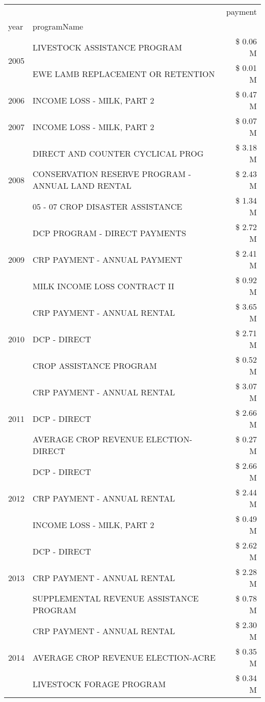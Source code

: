 \begin{tabular}{llr}
\toprule
 &  & payment \\
year & programName &  \\
\midrule
\multirow[t]{2}{*}{2005} & LIVESTOCK ASSISTANCE PROGRAM & \$ 0.06 M \\
 & EWE LAMB REPLACEMENT OR RETENTION & \$ 0.01 M \\
\cline{1-3}
2006 & INCOME LOSS - MILK, PART 2 & \$ 0.47 M \\
\cline{1-3}
2007 & INCOME LOSS - MILK, PART 2 & \$ 0.07 M \\
\cline{1-3}
\multirow[t]{3}{*}{2008} & DIRECT AND COUNTER CYCLICAL PROG & \$ 3.18 M \\
 & CONSERVATION RESERVE PROGRAM - ANNUAL LAND RENTAL & \$ 2.43 M \\
 & 05 - 07 CROP DISASTER ASSISTANCE & \$ 1.34 M \\
\cline{1-3}
\multirow[t]{3}{*}{2009} & DCP PROGRAM - DIRECT PAYMENTS & \$ 2.72 M \\
 & CRP PAYMENT - ANNUAL PAYMENT & \$ 2.41 M \\
 & MILK INCOME LOSS CONTRACT II & \$ 0.92 M \\
\cline{1-3}
\multirow[t]{3}{*}{2010} & CRP PAYMENT - ANNUAL RENTAL & \$ 3.65 M \\
 & DCP - DIRECT & \$ 2.71 M \\
 & CROP ASSISTANCE PROGRAM & \$ 0.52 M \\
\cline{1-3}
\multirow[t]{3}{*}{2011} & CRP PAYMENT - ANNUAL RENTAL & \$ 3.07 M \\
 & DCP - DIRECT & \$ 2.66 M \\
 & AVERAGE CROP REVENUE ELECTION-DIRECT & \$ 0.27 M \\
\cline{1-3}
\multirow[t]{3}{*}{2012} & DCP - DIRECT & \$ 2.66 M \\
 & CRP PAYMENT - ANNUAL RENTAL & \$ 2.44 M \\
 & INCOME LOSS - MILK, PART 2 & \$ 0.49 M \\
\cline{1-3}
\multirow[t]{3}{*}{2013} & DCP - DIRECT & \$ 2.62 M \\
 & CRP PAYMENT - ANNUAL RENTAL & \$ 2.28 M \\
 & SUPPLEMENTAL REVENUE ASSISTANCE PROGRAM & \$ 0.78 M \\
\cline{1-3}
\multirow[t]{3}{*}{2014} & CRP PAYMENT - ANNUAL RENTAL & \$ 2.30 M \\
 & AVERAGE CROP REVENUE ELECTION-ACRE & \$ 0.35 M \\
 & LIVESTOCK FORAGE PROGRAM & \$ 0.34 M \\

\end{tabular}
